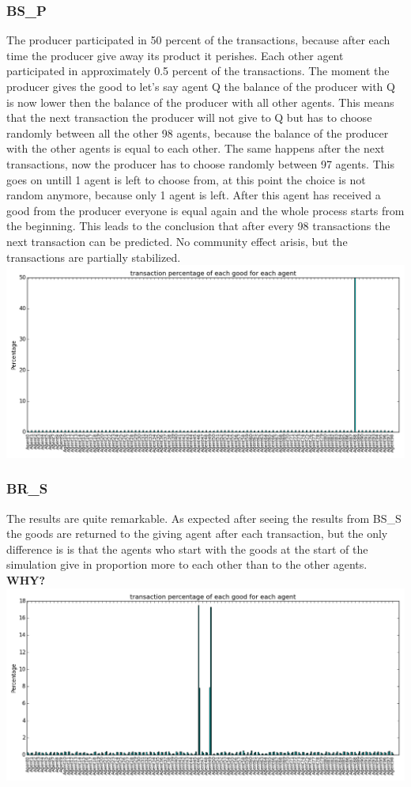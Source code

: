 \documentclass[twoside,openright]{uva-bachelor-thesis}
\begin{document}
\subsubsection{BS\_P}
The producer participated in 50 percent of the transactions, because after each time the producer give away its product it perishes. Each other agent participated in approximately 0.5 percent of the transactions. The moment the producer gives the good to let's say agent Q the balance of the producer with Q is now lower then the balance of the producer with all other agents. This means that the next transaction the producer will not give to Q but has to choose randomly between all the other 98 agents, because the balance of the producer with the other agents is equal to each other. The same happens after the next transactions, now the producer has to choose randomly between 97 agents. This goes on untill 1 agent is left to choose from, at this point the choice is not random anymore, because only 1 agent is left. After this agent has received a good from the producer everyone is equal again and the whole process starts from the beginning. This leads to the conclusion that after every 98 transactions the next transaction can be predicted.  No community effect arisis, but the transactions are partially stabilized. \\
\includegraphics[scale=0.5]{experiment_images/BR_BS_P}
\subsubsection{BR\_S}
The results are quite remarkable. As expected after seeing the results from BS\_S the goods are returned to the giving agent after each transaction, but the only difference is is that the agents who start with the goods at the start of the simulation give in proportion more to each other than to the other agents. \textbf{WHY?} \\
\includegraphics[scale=0.5]{experiment_images/BR_S}
\end{document}
